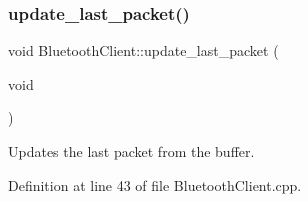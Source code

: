 \mbox{\label{class_bluetooth_client_a52ed2098b5525a6aef38af5af5c74a91}} 
\subsubsection{\texorpdfstring{update\+\_\+last\+\_\+packet()}{update\_last\_packet()}}
{\footnotesize\ttfamily void Bluetooth\+Client\+::update\+\_\+last\+\_\+packet (\begin{DoxyParamCaption}\item[{void}]{ }\end{DoxyParamCaption})\hspace{0.3cm}{\ttfamily [private]}}



Updates the last packet from the buffer. 



Definition at line 43 of file Bluetooth\+Client.\+cpp.


